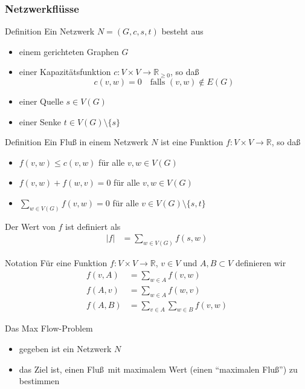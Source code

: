 \documentclass[aspectratio=1610, 11pt]{beamer}
\newcommand\RR{\mathbb R}
\newcommand\RRpos{\mathbb R_{\geq0}}
\newcommand{\mytitle}{Netzwerkfl\"usse}
\begin{document}
\begin{frame}\frametitle{\mytitle}
	\begin{overprint}
		\begin{block}{Definition}
			Ein \alert{Netzwerk} $N=(G,c,s,t)$ besteht aus
			\begin{itemize}
				\item einem gerichteten Graphen $G$
				\item einer Kapazit\"atsfunktion $c:V\times V\to\RRpos$, so da\ss
					$$c(v,w)=0\quad\mbox{falls }(v,w)\not\in E(G)$$
				\item einer Quelle $s\in V(G)$
				\item einer Senke $t\in V(G)\setminus\{s\}$
			\end{itemize}
		\end{block}
		\begin{exampleblock}{Definition}
			Ein \alert{Flu\ss} in einem Netzwerk $N$ ist eine Funktion $f:V\times V\to\RR$, so da\ss
			\begin{itemize}
				\item $f(v,w)\leq c(v,w)$ f\"ur alle $v,w\in V(G)$
				\item $f(v,w)+f(w,v)=0$ f\"ur alle $v,w\in V(G)$
				\item $\sum_{w\in V(G)}f(v,w)=0$ f\"ur alle $v\in V(G)\setminus\{s,t\}$
			\end{itemize}
			Der \alert{Wert} von $f$ ist definiert als
			\begin{align*}
				|f|&=\sum_{w\in V(G)}f(s,w)
			\end{align*}
		\end{exampleblock}
		\begin{exampleblock}{Notation}
			F\"ur eine Funktion $f:V\times V\to \RR$, $v\in V$ und $A,B\subset V$ definieren wir
			\begin{align*}
				f(v,A)&=\sum_{w\in A}f(v,w)\\
				f(A,v)&=\sum_{w\in A}f(w,v)\\
				f(A,B)&=\sum_{v\in A}\sum_{w\in B}f(v,w)
			\end{align*}
		\end{exampleblock}
		\begin{exampleblock}{Das Max Flow-Problem}
			\begin{itemize}
				\item gegeben ist ein Netzwerk $N$
				\item das Ziel ist, einen Flu\ss\ mit maximalem Wert (einen ``maximalen Flu\ss'') zu bestimmen

\end{itemize}
\end{exampleblock}
\end{overprint}
\end{frame}
\end{document}
